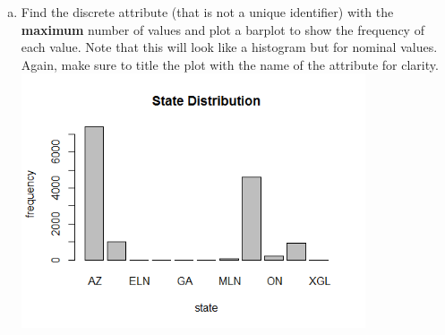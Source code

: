 \documentclass[11pt]{article}
\begin{document}
\begin{enumerate}[(a)]
\item 
Find the discrete attribute (that is not a unique identifier) with the \textbf{maximum} number of values and plot a barplot to show the frequency of each value. 
Note that this will look like a histogram but for nominal values. Again, make sure to title the plot with the name of the attribute for clarity.\\
\includegraphics[width=4in]{barplot_discrete.png}



\end{enumerate}
\end{document}
